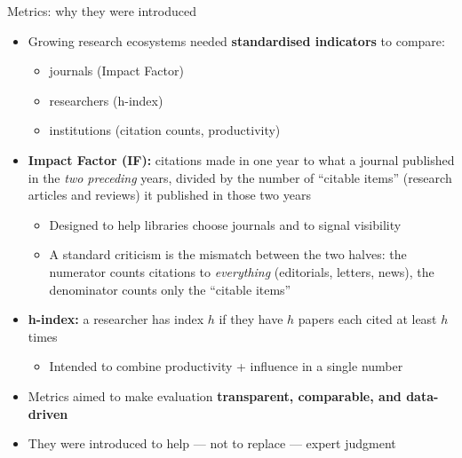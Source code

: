 \documentclass[aspectratio=169]{beamer}
\begin{document}
\begin{frame}{Metrics: why they were introduced}
\begin{itemize}

  \item Growing research ecosystems needed \textbf{standardised indicators} to compare:
    \begin{itemize}
      \item journals (Impact Factor)
      \item researchers (h-index)
      \item institutions (citation counts, productivity)
    \end{itemize}

  \item \textbf{Impact Factor (IF):} citations made in one year to what a journal published in the \emph{two preceding} years, divided by the number of ``citable items'' (research articles and reviews) it published in those two years
  \begin{itemize}
    \item Designed to help libraries choose journals and to signal visibility
    \item A standard criticism is the mismatch between the two halves: the numerator counts citations to \emph{everything} (editorials, letters, news), the denominator counts only the ``citable items''
  \end{itemize}

  \item \textbf{h-index:} a researcher has index $h$ if they have $h$ papers each cited at least $h$ times
  \begin{itemize}
    \item Intended to combine productivity + influence in a single number
  \end{itemize}

  \item Metrics aimed to make evaluation \textbf{transparent, comparable, and data-driven}
  \item They were introduced to help — not to replace — expert judgment

\end{itemize}
\end{frame}
\end{document}
